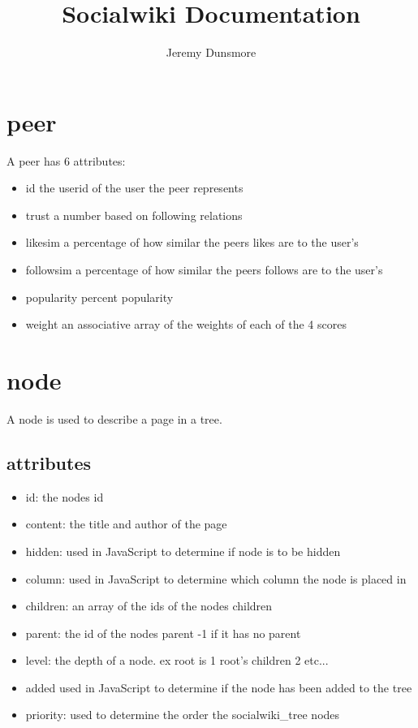 \documentclass[letterpaper,twoside,12pt]{report}
\begin{document}
\pagestyle{empty} %



\title{Socialwiki Documentation}
\author{Jeremy Dunsmore}
\maketitle

\tableofcontents %
\cleardoublepage %

\pagestyle{plain} %

\section{peer}
 A peer has 6 attributes:
	\begin{itemize}
		\item id the userid of the user the peer represents
		\item	trust a number based on following relations 
		\item	likesim a percentage of how similar the peers likes are to the user's
		\item	followsim a percentage of how similar the peers follows are to the user's
		\item popularity percent popularity  
		\item weight an associative array of the weights of each of the 4 scores
	\end{itemize}

\section{node}
A node is used to describe a page in a tree.
\subsection{attributes}
\begin{itemize}
	\item id: the nodes id
	\item content: the title and author of the page
	\item hidden: used in JavaScript to determine if node is to be hidden
	\item column: used in JavaScript to determine which column the node is placed in
	\item children: an array of the ids of the nodes children
	\item parent: the id of the nodes parent -1 if it has no parent
	\item level: the depth of a node. ex root is 1 root's children 2 etc...
	\item added used in JavaScript to determine if the node has been added to the tree
	\item priority: used to determine the order the socialwiki\_tree nodes
\end{itemize}
\end{document}
